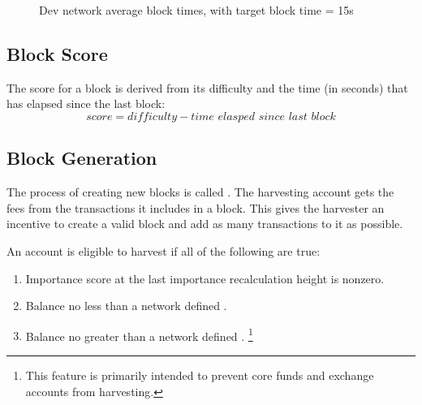 \begin{figure}
	\caption{Dev network average block times, with target block time = 15s}
\end{figure}

\subsection{Block Score}
\label{sec:blockchain:blockScore}
\label{sec:blockchain:score}

The score for a block is derived from its difficulty and the time (in seconds) that has elapsed since the last block:
\begin{equation}
\tag{block score} \mathit{score} = \mathit{difficulty} - \textit{time elasped since last block}
\end{equation}

\subsection{Block Generation}
\label{sec:blockchain:generation}

The process of creating new blocks is called .
The harvesting account gets the fees from the transactions it includes in a block.
This gives the harvester an incentive to create a valid block and add as many transactions to it as possible.

An account is eligible to harvest if all of the following are true:
\begin{enumerate}
\item{Importance score at the last importance recalculation height is nonzero.}
\item{Balance no less than a network defined .}
\item{Balance no greater than a network defined .}
\footnote{This feature is primarily intended to prevent core funds and exchange accounts from harvesting.}
\end{enumerate}

